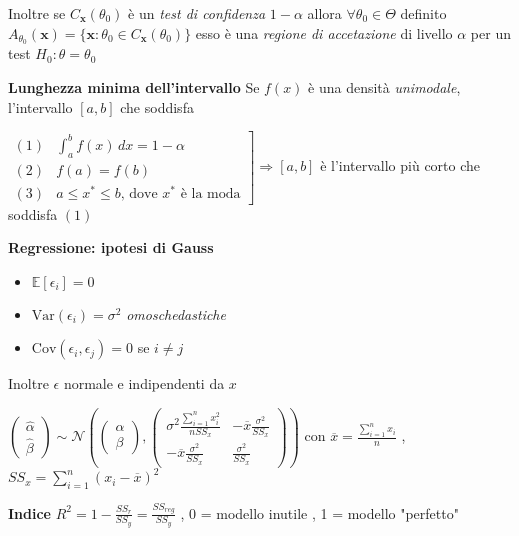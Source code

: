 \documentclass[openany]{book} %
\begin{document}
Inoltre se $C_{\boldsymbol{x}}(\theta_0)$ è un \textit{test di confidenza} $1-\alpha$ allora $\forall\theta_0\in\Theta$ definito $A_{\theta_0}(\boldsymbol{x})=\{\boldsymbol{x}:\theta_0\in C_{\boldsymbol{x}}(\theta_0)\}$ esso è una \textit{regione di accetazione} di livello $\alpha$ per un test $H_0:\theta=\theta_0$

\textbf{Lunghezza minima dell'intervallo} Se $f(x)$ è una densità \textit{unimodale}, l'intervallo $[a,b]$ che soddisfa 

$\left. \begin{array}{ll} 
(1) & \int_a^bf(x)\,dx=1-\alpha\\
(2) & f(a)=f(b)\\
(3) & a\leq x^*\leq b \text{, dove }x^* \text{ è la moda}	
\end{array}\right]
\Rightarrow [a,b]$ è l'intervallo più corto che soddisfa $(1)$

\textbf{Regressione: ipotesi di Gauss} 

\begin{itemize}

\item $\mathbb{E}[\epsilon_i]=0$

\item $\text{Var}(\epsilon_i)=\sigma^2$ \textit{omoschedastiche}

\item $\text{Cov}(\epsilon_i,\epsilon_j)=0$ se $i\neq j$

\end{itemize}

Inoltre $\epsilon$ normale e indipendenti da $x$

$\left(\begin{array}{c}\hat\alpha \\ \hat\beta\end{array}\right)\sim \mathcal{N}\left(\left(\begin{array}{c} \alpha \\ \beta \end{array}\right),\left(\begin{array}{cc} \sigma^2 \frac{\sum_{i=1}^nx_i^2}{nSS_x} & -\overline x \frac{\sigma^2}{SS_x} \\ -\overline x \frac{\sigma^2}{SS_x} & \frac{\sigma^2}{SS_x} \end{array}\right)\right)$ con $\overline x = \frac{\sum_{i=1}^nx_i}{n}$ , $SS_x = \sum_{i=1}^n(x_i-\overline x)^2 $

\textbf{Indice} $R^2=1-\frac{SS_r}{SS_y}=\frac{SS_{reg}}{SS_y}$  , 0 = modello inutile , 1 = modello "perfetto"
\end{document}
